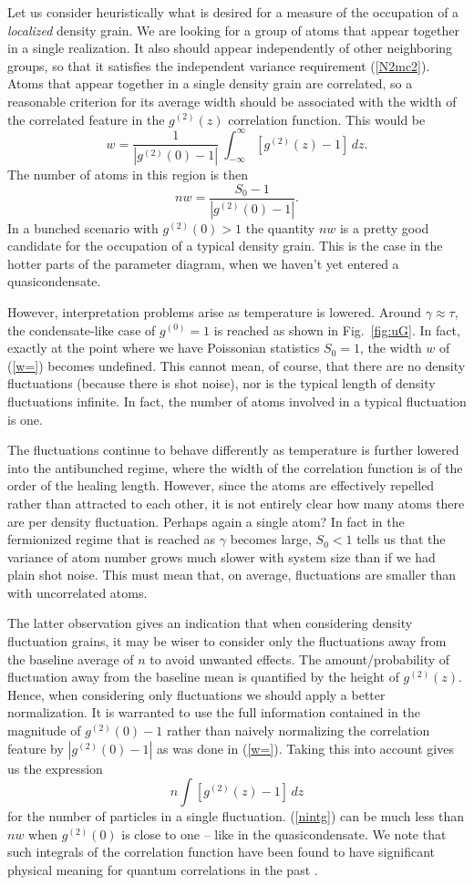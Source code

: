 \documentclass[aps,twocolumn,pra,superscriptaddress,nofootinbib,amsmath,amssymb,floats,floatfix,english]{revtex4-1}
\newcommand{\eqn}[1]{(\ref{#1})}
\renewcommand{\eq}[2]{\begin{equation}\label{#1}#2\end{equation}}
\begin{document}
Let us consider heuristically what is desired for a measure of the occupation of a \emph{localized} density grain.  
We are looking for a group of atoms that appear together in a single realization. It also should appear independently of other neighboring groups, so that it satisfies the independent variance requirement \eqn{N2mc2}.
Atoms that appear together in a single density grain are correlated, so a reasonable criterion for its average width should be associated with the width of the correlated feature in the $g^{(2)}(z)$ correlation function. 
This would be
\eq{w=}{
w = \frac{1}{|g^{(2)}(0)-1|}\ \int_{-\infty}^{\infty} \left[g^{(2)}(z)-1\right]\,dz.
}
The number of atoms in this region is 
then
\eq{mcN0}{
nw = \frac{S_0-1}{|g^{(2)}(0)-1|}.
}
In a bunched scenario with $g^{(2)}(0)>1$ the quantity $nw$ is a pretty good candidate for the occupation of a typical density grain.
This is the case in the hotter parts of the parameter diagram, when we haven't yet entered a quasicondensate.

However, interpretation problems arise as temperature is lowered. Around $\gamma\approx\tau$, the condensate-like case of $g^{(0)}=1$ is reached as shown in Fig.~\ref{fig:uG}. In fact, exactly at the point where we have Poissonian statistics $S_0=1$, the width $w$ of \eqn{w=} becomes undefined. This cannot mean, of course, that there are no density fluctuations (because there is shot noise), nor is the typical length of density fluctuations infinite.
In fact, the number of atoms involved in a typical fluctuation is one.

The fluctuations continue to behave differently as temperature is further lowered into the antibunched regime, where the width of the correlation function is of the order of the healing length. However, since the atoms are effectively repelled rather than attracted to each other, it is not entirely clear how many atoms there are per density fluctuation. Perhaps again a single atom?
In fact in the fermionized regime that is reached as $\gamma$ becomes large, $S_0<1$ tells us that the variance of atom number grows much slower with system size than if we had plain shot noise. 
This must mean that, on average, fluctuations are smaller than with uncorrelated atoms.

The latter observation gives an indication that when considering density fluctuation grains, it may be wiser to consider only the fluctuations away from the baseline average of $n$
to avoid unwanted effects. The amount/probability of fluctuation away from the baseline mean is quantified by the height of $g^{(2)}(z)$.
Hence, when considering only fluctuations we should apply a better normalization. 
It is warranted to use the full information contained in the magnitude of $g^{(2)}(0)-1$
rather than naively normalizing the correlation feature by $|g^{(2)}(0)-1|$ as was done in \eqn{w=}.
Taking this into account gives us the expression
\eq{nintg}{
n\int \left[g^{(2)}(z)-1\right]\,dz
}
for the number of particles in a single fluctuation. 
\eqn{nintg} can be much less than $nw$ when $g^{(2)}(0)$ is close to one -- like in the quasicondensate.
We note that such integrals of the correlation function have been found to have significant physical meaning for quantum correlations in the past \cite{Kheruntsyan12,Deuar13}.
\end{document}
